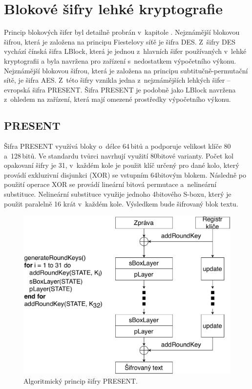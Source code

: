 \section{Blokové šifry lehké kryptografie}
Princip blokových šifer byl detailně probrán v~kapitole . Nejznámější blokovou šifrou, která je založena na principu Fiestelovy síťě je šifra DES. Z~šifry DES vychází čínská šifra LBlock, která je jednou z~hlavních šifer používaných v~lehké kryptografii a byla navržena pro zařízení s~nedostatkem výpočetního výkonu. Nejznámější blokovou šifrou, která je založena na principu subtitučně-permutační sítě, je šifra AES. Z~této šifry vznikla jedna z~nejznámějších lehkých šifer -- evropská šifra PRESENT. Šifra PRESENT je podobně jako LBlock navržena z~ohledem na zařízení, která mají omezené prostředky výpočetního výkonu.\cite{NekuzaBP}

\subsection{PRESENT}
Šifra PRESENT využívá bloky o~délce 64\,bitů a podporuje velikost klíče 80 a~128\,bitů. Ve standardu tvůrci navrhují využití 80bitové varianty. Počet kol opakovaní šifry je 31, v~každém kole je použit klíč určený pro dané kolo, který provádí exkluzivní disjunkci (XOR) se vstupním 64bitovým blokem. Následně po použití operace XOR se provádí lineární bitová permutace a~nelineární substituce. Nelineární substituce využije jednoho 4bitového S-boxu, který je použit paralelně 16 krát v~každém kole. Výsledkem bude šifrovaný blok textu.\cite{PRESENT}
\begin{figure}[!h]
  \begin{center}
    \includegraphics[scale=0.5]{obrazky/present.pdf}
  \end{center}
  \caption[Algoritmcký princip šifry PRESENT]{Algoritmický princip šifry PRESENT.\cite{PRESENT}}
  \label{img:present}
\end{figure}

